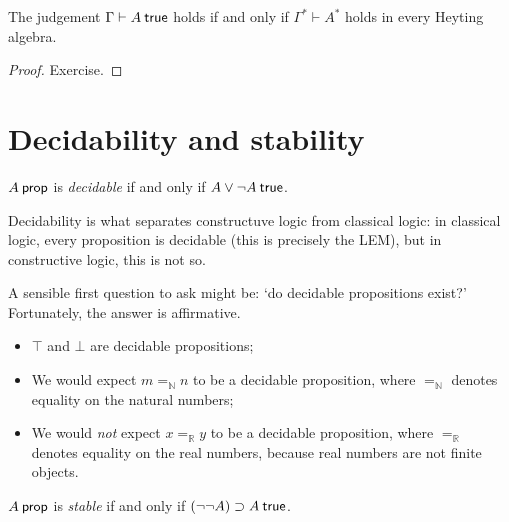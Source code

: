 \documentclass[12pt]{article}
\newenvironment{theorem}[1][Theorem.]{\begin{trivlist}\item[\hskip \labelsep {\bfseries #1}]}{\end{trivlist}}
\newenvironment{definition}[1][Definition.]{\begin{trivlist}\item[\hskip \labelsep {\bfseries #1}]}{\end{trivlist}}
\begin{document}
\begin{theorem}
The judgement $\Gamma \vdash A \true$ holds if and only if $\Gamma^* \vdash A^*$ holds in every Heyting algebra.
\end{theorem}
\begin{proof}
Exercise.
\end{proof}

\section{Decidability and stability}

\begin{definition}
$A \prop$ is \emph{decidable} if and only if $A \disj \neg A \true$.
\end{definition}

Decidability is what separates constructuve logic from classical logic: in classical logic, every proposition is decidable (this is precisely the \acl{LEM}), but in constructive logic, this is not so.

A sensible first question to ask might be: `do decidable propositions exist?' Fortunately, the answer is affirmative.
\begin{itemize}
\item $\top$ and $\bot$ are decidable propositions;
\item We would expect $m =_{\mathbb{N}} n$ to be a decidable proposition, where $=_{\mathbb{N}}$ denotes equality on the natural numbers;
\item We would \emph{not} expect $x =_{\mathbb{R}} y$ to be a decidable proposition, where $=_{\mathbb{R}}$ denotes equality on the real numbers, because real numbers are not finite objects.
\end{itemize}

\begin{definition}
$A \prop$ is \emph{stable} if and only if $(\neg \neg A) \imp A \true$.
\end{definition}
\end{document}
